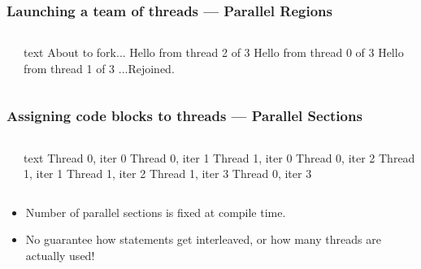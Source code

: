 \documentclass[handout]{beamer}
\begin{document}
\begin{frame}[fragile]
  \frametitle{Launching a team of threads --- Parallel Regions}
  \begin{columns}[t]%
    \begin{column}{0.65\textwidth}
    \end{column}
    \pause
    \begin{column}{0.4\textwidth}
      \begin{ccode}[]
        {text}
        About to fork...
        Hello from thread 2 of 3
        Hello from thread 0 of 3
        Hello from thread 1 of 3
        ...Rejoined.
      \end{ccode}
    \end{column}
  \end{columns}
  \pause
\end{frame}

\begin{frame}[fragile]
  \frametitle{Assigning code blocks to threads --- Parallel Sections}
  \begin{columns}[t]%
    \begin{column}{0.65\textwidth}
    \end{column}
    \pause
    \begin{column}{0.4\textwidth}
      \begin{ccode}[]
        {text}
        Thread 0, iter 0
        Thread 0, iter 1
          Thread 1, iter 0
        Thread 0, iter 2
          Thread 1, iter 1
          Thread 1, iter 2
          Thread 1, iter 3
        Thread 0, iter 3\end{ccode}
    \end{column}
  \end{columns}
  \pause
  \begin{itemize}
  \item Number of parallel sections is fixed at compile time.
  \item No guarantee how statements get interleaved, or how many threads are actually used!
  \end{itemize}
\end{frame}
\end{document}
